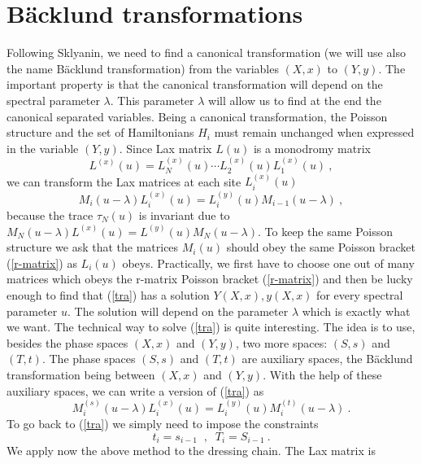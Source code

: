 \documentclass[a4paper,11pt]{article}
\begin{document}
\section{B\"acklund transformations }
Following Sklyanin, we need to find a canonical transformation (we will use
also the name B\"acklund transformation) from the variables $(X,x)$ to
$(Y,y)$. The important property is that the canonical transformation will
depend on the spectral parameter $\lambda $. This parameter $\lambda $ will
allow us to find at the end the canonical separated variables. Being a
canonical transformation, the Poisson structure and the set of Hamiltonians
$H_i$ must remain unchanged when expressed in the variable $(Y,y)$. Since
Lax matrix $L(u)$ is a monodromy matrix
\begin{equation}
\label{Mo}
L^{(x)}(u)=L_N^{(x)}(u) \cdots L_2^{(x)}(u)L_1^{(x)}(u) ~,
\end{equation}
we can transform the Lax matrices at each site $L_i^{(x)}(u)$
\begin{equation}
\label{tra}
M_i(u-\lambda)L_i^{(x)}(u)=L_i^{(y)}(u)M_{i-1}(u-\lambda) ~,
\end{equation}
because the trace $\tau _N(u)$ is invariant due to
$M_N(u-\lambda)L^{(x)}(u)=L^{(y)}(u)M_N(u-\lambda)$. To keep the same
Poisson structure we ask that the matrices $M_i(u)$ should obey the same
Poisson bracket (\ref{r-matrix}) as $L_i(u)$ obeys. Practically, we first
have to choose one out of many matrices which obeys the r-matrix Poisson
bracket (\ref{r-matrix}) and then be lucky enough to find that (\ref{tra})
has a solution $Y(X,x), y(X,x)$ for every spectral parameter $u$. The
solution will depend on the parameter $\lambda $ which is exactly what we
want. The technical way to solve (\ref{tra}) is quite interesting. The idea
is to use, besides the phase spaces $(X,x)$ and $(Y,y)$, two more spaces:
$(S,s)$ and $(T,t)$. The phase spaces $(S,s)$ and $(T,t)$ are auxiliary
spaces, the B\"acklund transformation being between $(X,x)$ and $(Y,y)$.
With the help of these auxiliary spaces, we can write a version of
(\ref{tra}) as
\begin{equation}
\label{trast}
M_i^{(s)}(u-\lambda)L_i^{(x)}(u)=L_i^{(y)}(u)M_i^{(t)}(u-\lambda)~.
\end{equation}
To go back to (\ref{tra}) we simply need to impose the constraints
\begin{equation}
\label{cons}
t_i=s_{i-1}\;\; , \;\;T_i=S_{i-1} ~.
\end{equation}
We apply now the above method to the dressing chain. The Lax matrix is
\end{document}
